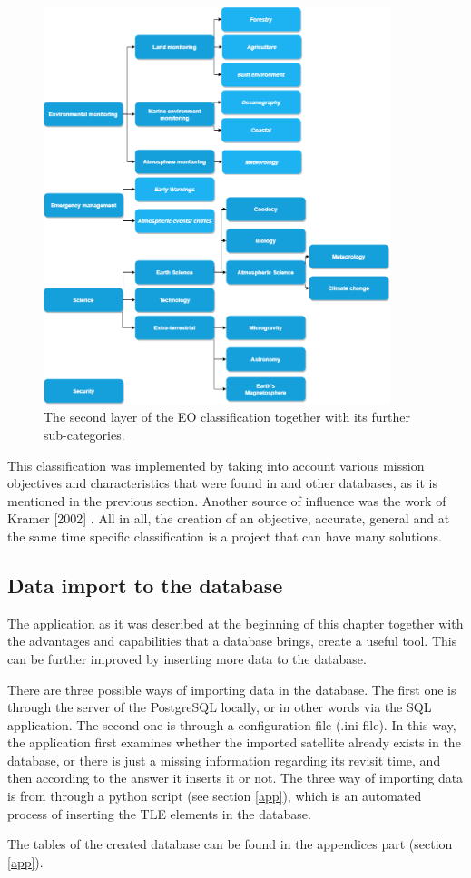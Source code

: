 \begin{figure}
\centering
\includegraphics[width=0.9\textwidth]{Images/classification_2nd_layer.png}\caption{The second layer of the EO classification together with its further sub-categories.}
\label{classification_2nd_layer}
\end{figure}

This classification was implemented by taking into account various mission objectives and characteristics that were found in \cite{Newspace} and other databases, as it is mentioned in the previous section. Another source of influence was the work of Kramer [2002] \cite{Kramer 2002}. All in all, the creation of an objective, accurate, general and at the same time specific classification is a project that can have many solutions.

\bigskip
\subsection{Data import to the database}
\bigskip

The application as it was described at the beginning of this chapter together with the advantages and capabilities that a database brings, create a useful tool. This can be further improved by inserting more data to the database.

There are three possible ways of importing data in the database. The first one is through the server of the PostgreSQL locally, or in other words via the SQL application. The second one is through a configuration file (.ini file). In this way, the application first examines whether the imported satellite already exists in the database, or there is just a missing information regarding its revisit time, and then according to the answer it inserts it or not. The three way of importing data is from through a python script (see section \ref{app}), which is an automated process of inserting the TLE elements in the database.

\bigskip
The tables of the created database can be found in the appendices part (section \ref{app}).